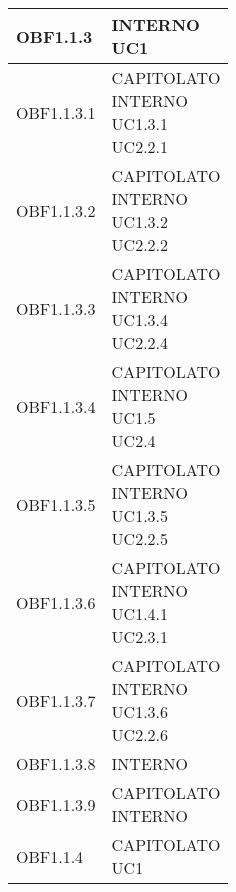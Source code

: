 \documentclass{scalatekids-article}
\begin{document}
\begin{longtable}[H]{|p{5.5cm}|p{5.5cm}|}
\hline
OBF1.1.3 & \multiLineCell[t]{INTERNO\\UC1\\}\\
\hline
OBF1.1.3.1 & \multiLineCell[t]{CAPITOLATO\\INTERNO\\UC1.3.1\\UC2.2.1\\}\\
\hline
OBF1.1.3.2 & \multiLineCell[t]{CAPITOLATO\\INTERNO\\UC1.3.2\\UC2.2.2\\}\\
\hline
OBF1.1.3.3 & \multiLineCell[t]{CAPITOLATO\\INTERNO\\UC1.3.4\\UC2.2.4\\}\\
\hline
OBF1.1.3.4 & \multiLineCell[t]{CAPITOLATO\\INTERNO\\UC1.5\\UC2.4\\}\\
\hline
OBF1.1.3.5 & \multiLineCell[t]{CAPITOLATO\\INTERNO\\UC1.3.5\\UC2.2.5\\}\\
\hline
OBF1.1.3.6 & \multiLineCell[t]{CAPITOLATO\\INTERNO\\UC1.4.1\\UC2.3.1\\}\\
\hline
OBF1.1.3.7 & \multiLineCell[t]{CAPITOLATO\\INTERNO\\UC1.3.6\\UC2.2.6\\}\\
\hline
OBF1.1.3.8 & \multiLineCell[t]{INTERNO\\}\\
\hline
OBF1.1.3.9 & \multiLineCell[t]{CAPITOLATO\\INTERNO\\}\\
\hline
OBF1.1.4 & \multiLineCell[t]{CAPITOLATO\\UC1\\}\\

\end{longtable}
\end{document}

